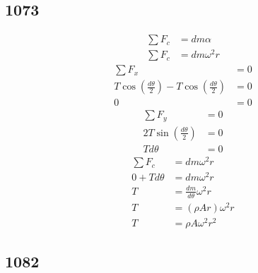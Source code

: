 \documentclass{article}
\begin{document}
\subsection{1073}

\begin{align*}
	\sum F_c & = dm\alpha \\
	\sum F_c & = dm\omega^2r
\end{align*}
\begin{align*}
	\sum F_x & = 0 \\
	T\cos \left( \frac{ d\theta }{ 2 } \right) - T \cos \left( \frac{ d\theta }{ 2 } \right) & = 0 \\
	0 & = 0
\end{align*}
\begin{align*}
	\sum F_y & = 0 \\
	2T\sin \left( \frac{ d\theta }{ 2 } \right) & = 0 \\
	Td\theta & = 0
\end{align*}
\begin{align*}
	\sum F_c & = dm\omega^2r \\
	0 + Td\theta & = dm\omega^2r \\
	T & = \frac{dm}{d\theta}\omega^2r \\
	T & = (\rho A r)\omega^2r \\
	T & = \rho A\omega^2r^2
\end{align*}

\subsection{1082}
\end{document}
